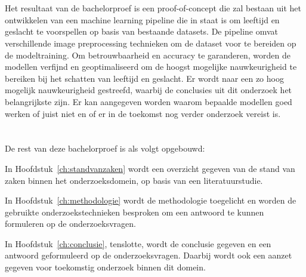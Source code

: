 \section{}%
\label{sec:onderzoeksdoelstelling}

Het resultaat van de bachelorproef is een proof-of-concept die zal bestaan uit het ontwikkelen van een machine learning pipeline die in staat is om leeftijd en geslacht te voorspellen op basis van bestaande datasets. De pipeline omvat verschillende image preprocessing technieken om de dataset voor te bereiden op de modeltraining. Om betrouwbaarheid en accuracy te garanderen, worden de modellen verfijnd en geoptimaliseerd om de hoogst mogelijke nauwkeurigheid te bereiken bij het schatten van leeftijd en geslacht. Er wordt naar een zo hoog mogelijk nauwkeurigheid gestreefd, waarbij de conclusies uit dit onderzoek het belangrijkste zijn. Er kan aangegeven worden waarom bepaalde modellen goed werken of juist niet en of er in de toekomst nog verder onderzoek vereist is. 


\section{}%
\label{sec:opzet-bachelorproef}


De rest van deze bachelorproef is als volgt opgebouwd:

In Hoofdstuk~\ref{ch:standvanzaken} wordt een overzicht gegeven van de stand van zaken binnen het onderzoeksdomein, op basis van een literatuurstudie.

In Hoofdstuk~\ref{ch:methodologie} wordt de methodologie toegelicht en worden de gebruikte onderzoekstechnieken besproken om een antwoord te kunnen formuleren op de onderzoeksvragen.


In Hoofdstuk~\ref{ch:conclusie}, tenslotte, wordt de conclusie gegeven en een antwoord geformuleerd op de onderzoeksvragen. Daarbij wordt ook een aanzet gegeven voor toekomstig onderzoek binnen dit domein.